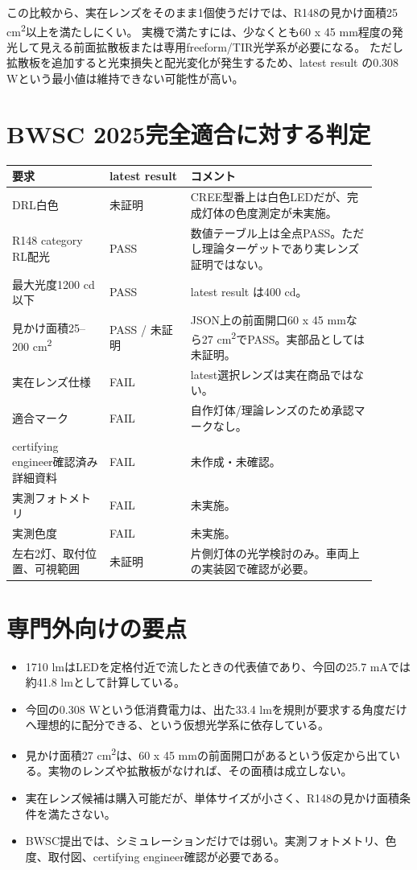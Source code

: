 \documentclass[11pt,a4paper]{article}
\newcommand{\pass}{\textcolor{green!45!black}{PASS}}
\newcommand{\fail}{\textcolor{red!70!black}{FAIL}}
\newcommand{\warn}{\textcolor{orange!80!black}{未証明}}
\begin{document}
この比較から、実在レンズをそのまま1個使うだけでは、R148の見かけ面積25 cm\textsuperscript{2}以上を満たしにくい。
実機で満たすには、少なくとも60 x 45 mm程度の発光して見える前面拡散板または専用freeform/TIR光学系が必要になる。
ただし拡散板を追加すると光束損失と配光変化が発生するため、latest result の0.308 Wという最小値は維持できない可能性が高い。

\section{BWSC 2025完全適合に対する判定}
\begin{longtable}{p{0.24\linewidth}p{0.20\linewidth}p{0.46\linewidth}}
\toprule
要求 & latest result & コメント\\
\midrule
DRL白色 & \warn & CREE型番上は白色LEDだが、完成灯体の色度測定が未実施。\\
R148 category RL配光 & \pass & 数値テーブル上は全点PASS。ただし理論ターゲットであり実レンズ証明ではない。\\
最大光度1200 cd以下 & \pass & latest result は400 cd。\\
見かけ面積25--200 cm\textsuperscript{2} & \pass{} / \warn & JSON上の前面開口60 x 45 mmなら27 cm\textsuperscript{2}でPASS。実部品としては未証明。\\
実在レンズ仕様 & \fail & latest選択レンズは実在商品ではない。\\
適合マーク & \fail & 自作灯体/理論レンズのため承認マークなし。\\
certifying engineer確認済み詳細資料 & \fail & 未作成・未確認。\\
実測フォトメトリ & \fail & 未実施。\\
実測色度 & \fail & 未実施。\\
左右2灯、取付位置、可視範囲 & \warn & 片側灯体の光学検討のみ。車両上の実装図で確認が必要。\\
\bottomrule
\end{longtable}

\section{専門外向けの要点}
\begin{itemize}
\item 1710 lmはLEDを定格付近で流したときの代表値であり、今回の25.7 mAでは約41.8 lmとして計算している。
\item 今回の0.308 Wという低消費電力は、出た33.4 lmを規則が要求する角度だけへ理想的に配分できる、という仮想光学系に依存している。
\item 見かけ面積27 cm\textsuperscript{2}は、60 x 45 mmの前面開口があるという仮定から出ている。実物のレンズや拡散板がなければ、その面積は成立しない。
\item 実在レンズ候補は購入可能だが、単体サイズが小さく、R148の見かけ面積条件を満たさない。
\item BWSC提出では、シミュレーションだけでは弱い。実測フォトメトリ、色度、取付図、certifying engineer確認が必要である。
\end{itemize}
\end{document}
